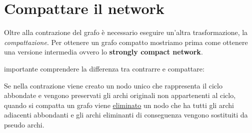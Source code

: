 \section{Compattare il network}
Oltre alla contrazione del grafo è necessario eseguire un'altra trasformazione, la \textit{compattazione}.
Per ottenere un grafo compatto mostriamo prima come ottenere una versione intermedia ovvero lo \textbf{strongly compact network}.

 importante comprendere la differenza tra contrarre e compattare:

Se nella contrazione viene creato un nodo unico che rappresenta il ciclo abbondate e vengono preservati gli archi originali non appartenenti al ciclo, 
quando si compatta un grafo viene \underline{eliminato} un nodo che ha tutti gli archi adiacenti abbondanti e gli archi eliminanti di conseguenza vengono sostituiti da pseudo archi.

